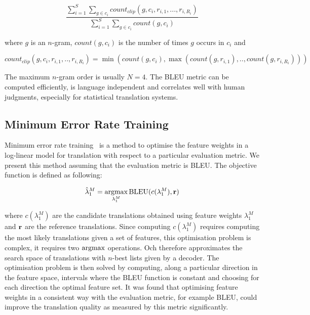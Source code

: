     \begin{equation}
      \frac{\sum_{i=1}^S \sum_{g \in c_i} count_{clip}(g,c_i,r_{i,1},...,r_{i,R_i})}{\sum_{i=1}^S \sum_{g \in c_i} count(g,c_i)}
    \end{equation}

    \noindent where $g$ is an $n$-gram, $count(g,c_i)$ is the number of times $g$ occurs in $c_i$ and 
    
    \begin{equation}
      count_{clip}(g,c_i,r_{i,1},..,r_{i,R_i}) = \min(count(g,c_i),\max(count(g,r_{i,1}),..,count(g,r_{i,R_i})))
    \end{equation}

    The maximum $n$-gram order is usually $N=4$. The BLEU metric can be computed efficiently, is language
    independent and correlates well with human judgments, especially for statistical translation systems.

    \subsection{Minimum Error Rate Training}
    \label{sec:mert}

    Minimum error rate training~\citep{och:2003:ACL} is a method to optimise the feature weights
    in a log-linear model for translation with respect to a particular evaluation metric. We present
    this method assuming that the evaluation metric is BLEU. The objective function is defined 
    as following:

    \begin{equation}
      \hat{\lambda}_1^M = \operatorname*{argmax}_{\lambda_1^M} \mbox{BLEU}(c(\lambda_1^M), {\bf r}) 
    \end{equation}

    \noindent where $c(\lambda_1^M)$ are the candidate translations obtained using feature
    weights $\lambda_1^M$ and ${\bf r}$ are the reference translations. Since computing $c(\lambda_1^M)$
    requires computing the most likely translations given a set of features, this
    optimisation problem is complex, it requires two $\operatorname*{argmax}$ operations. Och therefore approximates the search space of translations
    with $n$-best lists given by a decoder. The optimisation problem is then solved by 
    computing, along a particular direction in the feature space, intervals where the BLEU function 
    is constant and choosing for each direction the optimal feature set. It was found
    that optimising feature weights in a consistent way with the evaluation metric, for example
    BLEU, could improve the translation quality as measured by this metric significantly.

